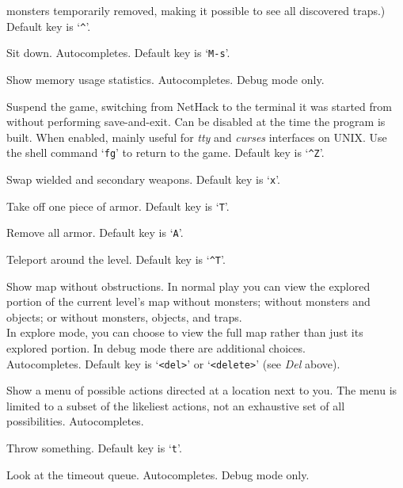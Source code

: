 monsters temporarily removed, making it possible to see all discovered
traps.)
Default key is `{\tt \^{}}'.
\item[\tb{\#sit}]
Sit down. Autocompletes. Default key is `{\tt M-s}'.
\item[\tb{\#stats}]
Show memory usage statistics.
Autocompletes.
Debug mode only.
\item[\tb{\#suspend}]
Suspend the game, switching from NetHack to the terminal it was started
from without performing save-and-exit.
Can be disabled at the time the program is built.
When enabled, mainly useful for {\it tty\/} and {\it curses\/} interfaces on
UNIX.
Use the shell command `{\tt fg}' to return to the game.
Default key is `{\tt \^{}Z}'.
\item[\tb{\#swap}]
Swap wielded and secondary weapons. Default key is `{\tt x}'.
\item[\tb{\#takeoff}]
Take off one piece of armor. Default key is `{\tt T}'.
\item[\tb{\#takeoffall}]
Remove all armor. Default key is `{\tt A}'.
\item[\tb{\#teleport}]
Teleport around the level. Default key is `{\tt \^{}T}'.
\item[\tb{\#terrain}]
Show map without obstructions.
In normal play you can view the explored portion of the current level's
map without monsters; without monsters and objects; or without monsters,
objects, and traps.\\
In explore mode, you can choose to view the full map rather than just
its explored portion.
In debug mode there are additional choices.\\
Autocompletes.
Default key is `{\tt <del>}' or `{\tt <delete>}' (see {\it Del\/} above).
\item[\tb{\#therecmdmenu}]
Show a menu of possible actions directed at a location next to you.
The menu is limited to a subset of the likeliest actions, not an
exhaustive set of all possibilities.
Autocompletes.
\item[\tb{\#throw}]
Throw something. Default key is `{\tt t}'.
\item[\tb{\#timeout}]
Look at the timeout queue.
Autocompletes.
Debug mode only.
\item[\tb{\#tip}]
